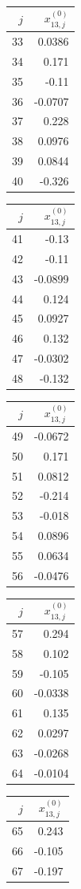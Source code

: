 {\begin{tabular}[t]{r|r}
$j$ & $x^{(0)}_{13,j}$ \\\hline
33 & 0.0386 \\
34 & 0.171 \\
35 & -0.11 \\
36 & -0.0707 \\
37 & 0.228 \\
38 & 0.0976 \\
39 & 0.0844 \\
40 & -0.326
\end{tabular}\kern4pt
\begin{tabular}[t]{r|r}
$j$ & $x^{(0)}_{13,j}$ \\\hline
41 & -0.13 \\
42 & -0.11 \\
43 & -0.0899 \\
44 & 0.124 \\
45 & 0.0927 \\
46 & 0.132 \\
47 & -0.0302 \\
48 & -0.132
\end{tabular}\kern4pt
\begin{tabular}[t]{r|r}
$j$ & $x^{(0)}_{13,j}$ \\\hline
49 & -0.0672 \\
50 & 0.171 \\
51 & 0.0812 \\
52 & -0.214 \\
53 & -0.018 \\
54 & 0.0896 \\
55 & 0.0634 \\
56 & -0.0476
\end{tabular}\kern4pt
\begin{tabular}[t]{r|r}
$j$ & $x^{(0)}_{13,j}$ \\\hline
57 & 0.294 \\
58 & 0.102 \\
59 & -0.105 \\
60 & -0.0338 \\
61 & 0.135 \\
62 & 0.0297 \\
63 & -0.0268 \\
64 & -0.0104
\end{tabular}\kern4pt
\begin{tabular}[t]{r|r}
$j$ & $x^{(0)}_{13,j}$ \\\hline
65 & 0.243 \\
66 & -0.105 \\
67 & -0.197 \\

\end{tabular}}
